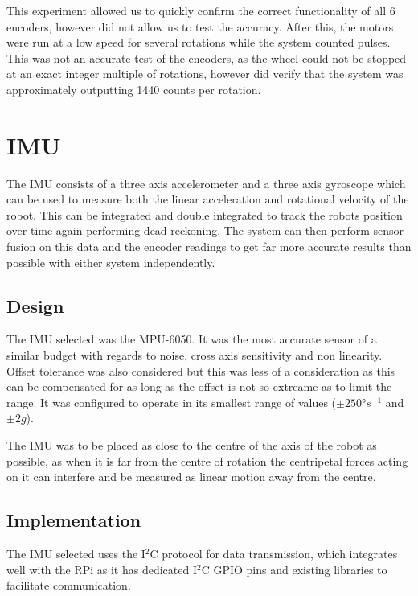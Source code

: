 This experiment allowed us to quickly confirm the correct functionality
of all 6 encoders, however did not allow us to test the accuracy. After 
this, the motors were run at a low speed for several rotations while the 
system counted pulses. This was not an accurate test of the encoders, as 
the wheel could not be stopped at an exact integer multiple of rotations, 
however did verify that the system was approximately outputting 1440 
counts per rotation.

\section{IMU}\label{elec/imu}
The IMU consists of a three axis accelerometer and a three axis gyroscope 
which can be used to measure both the linear acceleration and rotational 
velocity of the robot. This can be integrated and double integrated to 
track the robots position over time again performing dead reckoning. The 
system can then perform sensor fusion on this data and the encoder 
readings to get far more accurate results than possible with either system 
independently.

\subsection{Design}\label{elec/imu/design}
The IMU selected was the MPU-6050. It was the most accurate sensor of a 
similar budget with regards to noise, cross axis sensitivity and non 
linearity. Offset tolerance was also considered but this was less of a 
consideration as this can be compensated for as long as the offset is not 
so extreame as to limit the range. It was configured to operate in its 
smallest range of values ($\pm\ang{250}s^{-1}$ and $\pm2g$\cite{}).

The IMU was to be placed as close to the centre of the axis of the robot 
as possible, as when it is far from the centre of rotation the centripetal 
forces acting on it can interfere and be measured as linear motion away 
from the centre.

\subsection{Implementation}\label{elec/imu/impl}

The IMU selected uses the I$^2$C protocol for data transmission, which 
integrates well with the RPi as it has dedicated I$^2$C GPIO pins and 
existing libraries to facilitate communication.

